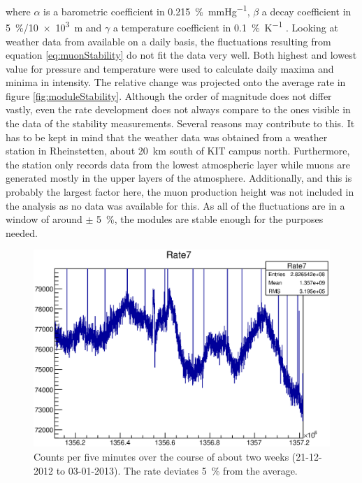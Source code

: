  where $\alpha$ is a barometric coefficient in \SI{0.215}{\percent\per\mmHg}, $\beta$ a decay coefficient in \SI{5}{\percent}/\SI{10e3}{\meter} and $\gamma$ a temperature coefficient in \SI{0.1}{\percent\per\kelvin} \cite{muonIntensity}.
  Looking at weather data from \cite{wetterCom} available on a daily basis, the fluctuations resulting from equation \ref{eq:muonStability} do not fit the data very well. Both highest and lowest value for pressure and temperature were used to calculate daily maxima and minima in intensity. The relative change was projected onto the average rate in figure \ref{fig:moduleStability}. Although the order of magnitude does not differ vastly, even the rate development does not always compare to the ones visible in the data of the stability measurements. Several reasons may contribute to this. It has to be kept in mind that the weather data was obtained from a weather station in Rheinstetten, about \SI{20}{\kilo\meter} south of KIT campus north. Furthermore, the station only records data from the lowest atmospheric layer while muons are generated mostly in the upper layers of the atmosphere. Additionally, and this is probably the largest factor here, the muon production height was not included in the analysis as no data was available for this. As all of the fluctuations are in a window of around $\pm$ \SI{5}{\percent}, the modules are stable enough for the purposes needed.
  \begin{figure}
  \centering
	\includegraphics[width = 0.9 \textwidth]{graphics/setup/stability.eps}
  	\caption[Muon module stability]{Counts per five minutes over the course of about two weeks (21-12-2012 to 03-01-2013). The rate deviates \SI{5}{\percent} from the average.}
  \end{figure}

